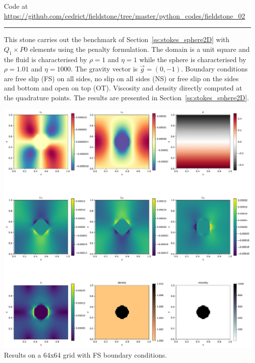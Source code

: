 

\begin{center}
Code at \url{https://github.com/cedrict/fieldstone/tree/master/python_codes/fieldstone_02}
\end{center}

\par\noindent\rule{\textwidth}{0.4pt}

This stone carries out the benchmark of Section~\ref{ss:stokes_sphere2D}
with $Q_1\times P0$ elements using the penalty formulation.
The domain is a unit square and the fluid is characterised 
by $\rho=1$ and $\eta=1$ 
while the sphere is characterised 
by $\rho=1.01$ and $\eta=1000$.
The gravity vector is $\vec{g}=(0,-1)$. 
Boundary conditions are free slip (FS) on all sides, no slip on all sides (NS)
or free slip on the sides and bottom and open on top (OT).
Viscosity and density directly computed at the quadrature points.
The results are presented in Section~\ref{ss:stokes_sphere2D}.

\begin{center}
\includegraphics[width=15cm]{python_codes/fieldstone_02/solution64FS.pdf}\\
{\captionfont Results on a 64x64 grid with FS boundary conditions.}
\end{center}


